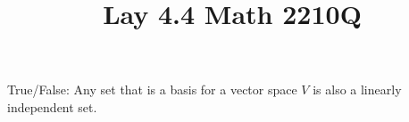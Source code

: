 \documentclass{ximera}
\begin{document}
  	\title{Lay 4.4  \hfill Math 2210Q} 
  \begin{question} True/False: Any set that is a basis for a vector space $V$ is also a linearly independent set.
  			
  			\begin{multipleChoice}
  			\end{multipleChoice}
  			
  		\end{question}	
  		
     
  
\end{document}
